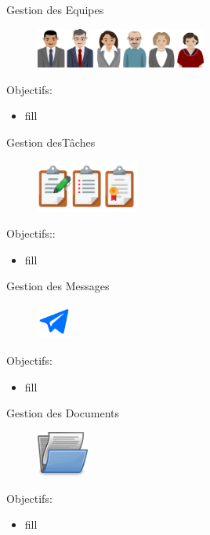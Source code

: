 \begin{frame}{Gestion des Equipes}
\begin{figure}[h!]
  \includegraphics[width=0.5\textwidth]{images/team}
\end{figure}
Objectifs:
  \begin{itemize}
\item fill
    \end{itemize}
\end{frame}

\begin{frame}{Gestion desTâches}
\begin{figure}[h!]
  \includegraphics[width=0.3\textwidth]{images/tasks}
\end{figure}
Objectifs::
  \begin{itemize}
\item fill
    \end{itemize}
\end{frame}

\begin{frame}{Gestion des Messages}
\begin{figure}[h!]
  \includegraphics[width=0.10\textwidth]{images/-59-512}
\end{figure}
Objectifs:
  \begin{itemize}
\item fill
    \end{itemize}
\end{frame}

\begin{frame}{Gestion des Documents}
\begin{figure}[h!]
  \includegraphics[width=0.15\textwidth]{images/document-open-hi}
\end{figure}
Objectifs:
  \begin{itemize}
\item fill
    \end{itemize}
\end{frame}


